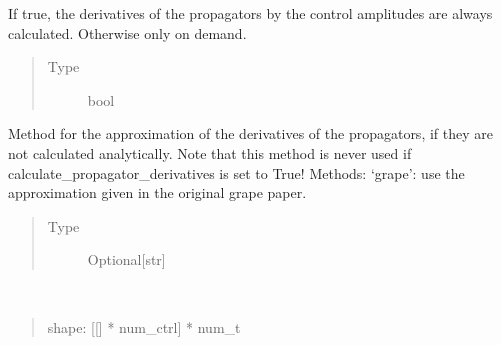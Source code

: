 \documentclass[letterpaper,10pt,english]{sphinxmanual}
\begin{document}
\begin{fulllineitems}

\begin{fulllineitems}
\label{\detokenize{qsim:qsim.solver_algorithms.SchroedingerSolver.calculate_propagator_derivatives}}
If true, the derivatives of the propagators by the control amplitudes
are always calculated. Otherwise only on demand.
\begin{quote}\begin{description}
\item[{Type}] \leavevmode
bool

\end{description}\end{quote}

\end{fulllineitems}


\begin{fulllineitems}
\label{\detokenize{qsim:qsim.solver_algorithms.SchroedingerSolver.frechet_deriv_approx_method}}
Method for the approximation of the derivatives of the propagators, if
they are not calculated analytically. Note that this method is never
used if calculate\_propagator\_derivatives is set to True!
Methods:
‘grape’: use the approximation given in the original grape paper.
\begin{quote}\begin{description}
\item[{Type}] \leavevmode
Optional{[}str{]}

\end{description}\end{quote}

\end{fulllineitems}



\begin{fulllineitems}
~\begin{quote}

shape: {[}{[}{]} * num\_ctrl{]} * num\_t
\end{quote}


\end{fulllineitems}
\end{fulllineitems}
\end{document}
